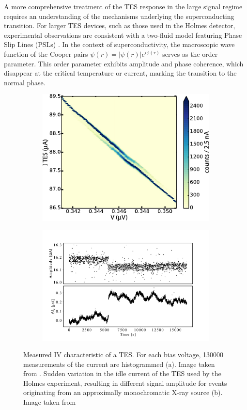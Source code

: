 A more comprehensive treatment of the TES response in the large signal regime requires an understanding of the mechanisms
underlying the superconducting transition. For larger TES devices, such as those used in the Holmes detector,
experimental observations are consistent with a two-fluid model featuring Phase Slip Lines (PSLs) \cite{PSLcenters}. In the context of
superconductivity, the macroscopic wave function of the Cooper pairs $\psi(r) = |\psi(r)|e^{i\phi(r)}$ serves as the
order parameter. This order parameter exhibits amplitude and phase coherence, which disappear at the critical
temperature or current, marking the transition to the normal phase.
\begin{figure}[t]
\begin{subfigure}[b]{0.4\linewidth}
    \includegraphics[width=\linewidth]{figures/ch1/PSL1.pdf}
    \caption{}
  \end{subfigure}
\hfill
\begin{subfigure}[b]{0.5\linewidth}
    \includegraphics[width=\linewidth]{figures/ch1/PLS2.jpg}
    \caption{}
  \end{subfigure}
  \caption{Measured IV characteristic of a TES. For each bias voltage, 130000
    measurements of the current are histogrammed (a). Image taken from  \cite{PSL}. Sudden variation in the idle current of the TES
used by the Holmes experiment, resulting in different signal amplitude for events originating from an approximally
monochromatic X-ray source (b). Image taken from  \cite{borghesi2022toward}}
\label{fig:PSL}
\end{figure}
